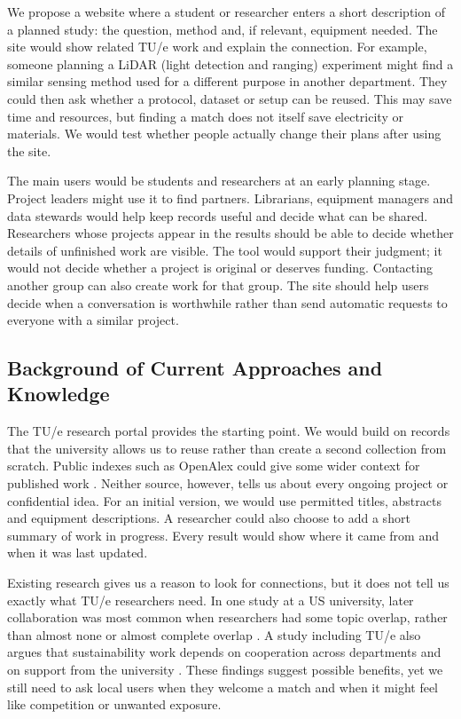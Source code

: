 \documentclass[11pt,a4paper]{article}
\begin{document}
We propose a website where a student or researcher enters a short description of a planned study: the question, method and, if relevant, equipment needed. The site would show related TU/e work and explain the connection. For example, someone planning a LiDAR (light detection and ranging) experiment might find a similar sensing method used for a different purpose in another department. They could then ask whether a protocol, dataset or setup can be reused. This may save time and resources, but finding a match does not itself save electricity or materials. We would test whether people actually change their plans after using the site.

The main users would be students and researchers at an early planning stage. Project leaders might use it to find partners. Librarians, equipment managers and data stewards would help keep records useful and decide what can be shared. Researchers whose projects appear in the results should be able to decide whether details of unfinished work are visible. The tool would support their judgment; it would not decide whether a project is original or deserves funding. Contacting another group can also create work for that group. The site should help users decide when a conversation is worthwhile rather than send automatic requests to everyone with a similar project.

\subsection*{Background of Current Approaches and Knowledge}

The TU/e research portal provides the starting point. We would build on records that the university allows us to reuse rather than create a second collection from scratch. Public indexes such as OpenAlex could give some wider context for published work \citep{openalex2026}. Neither source, however, tells us about every ongoing project or confidential idea. For an initial version, we would use permitted titles, abstracts and equipment descriptions. A researcher could also choose to add a short summary of work in progress. Every result would show where it came from and when it was last updated.

Existing research gives us a reason to look for connections, but it does not tell us exactly what TU/e researchers need. In one study at a US university, later collaboration was most common when researchers had some topic overlap, rather than almost none or almost complete overlap \citep{smith2021}. A study including TU/e also argues that sustainability work depends on cooperation across departments and on support from the university \citep{karo2026}. These findings suggest possible benefits, yet we still need to ask local users when they welcome a match and when it might feel like competition or unwanted exposure.
\end{document}
